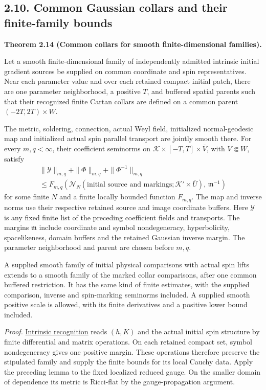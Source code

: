 \documentclass[
  english,
  11pt,
  reqno]{amsart}
\makeatletter
\newcommand{\paperdisplaynext}{%
  \let\paper@savedstartsection\@startsection
  \def\@startsection##1##2##3##4##5##6{%
    \let\@startsection\paper@savedstartsection
    \@tempskipa ##5\relax
    \ifdim\@tempskipa<\z@
      \def\paper@afterskip{.35\baselineskip}%
    \else
      \def\paper@afterskip{##5}%
    \fi
    \@startsection{##1}{##2}{##3}{##4}{\paper@afterskip}{##6}}}
\newcommand{\paperdisplaysection}{\paperdisplaynext\subsection}
\newcommand{\pandocstatementheading}[1]{%
  \par\if@nobreak\else
    \addpenalty{\@beginparpenalty}%
    \addvspace{.5\baselineskip plus .2\baselineskip minus .2\baselineskip}%
  \fi
  {\normalfont\bfseries #1\par}%
  \nobreak\@afterindenttrue\@afterheading
}
\let\paper@displaysection\paperdisplaysection
\renewcommand{\paperdisplaysection}[1]{%
  \let\paper@savedhangfrom\@hangfrom
  \long\def\@hangfrom##1##2{%
    \paper@savedhangfrom{##1}{\paper@headingparagraph##2}}%
  \paper@displaysection{#1}%
  \let\@hangfrom\paper@savedhangfrom}
\makeatother
\begin{document}
\paperdisplaysection{2.10. Common Gaussian collars and their finite-family
bounds}\label{common-gaussian-collars-and-their-finite-family-bounds}\label{sec:online-common-collar-families}

\pandocstatementheading{\leavevmode{}\label{thm:online-common-collar-finite-families}Theorem 2.14 (Common collars for smooth finite-dimensional families).}

Let a smooth finite-dimensional family of independently admitted
intrinsic initial gradient sources be supplied on common coordinate and
spin representatives. Near each parameter value and over each retained
compact initial patch, there are one parameter neighborhood, a positive
\(T\), and buffered spatial parents such that their recognized finite
Cartan collars are defined on a common parent \((-2T,2T)\times W\).

The metric, soldering, connection, actual Weyl field, initialized
normal-geodesic map and initialized actual spin parallel transport are
jointly smooth there. For every \(m,q<\infty\), their coefficient
seminorms on \(\mathcal K\times[-T,T]\times\overline V\), with
\(V\Subset W\), satisfy%
 \[
\begin{multlined}
\|\mathcal Y\|_{m,q}
+\|\Phi\|_{m,q}
+\|\Phi^{-1}\|_{m,q}
\\
\le
F_{m,q}\left(
\mathcal N_N(\text{initial source and markings};
\mathcal K'\times\overline U),\,
\mathfrak m^{-1}
\right)
\end{multlined}
\] for some finite \(N\) and a finite locally bounded function
\(F_{m,q}\). The map and inverse norms use their respective retained
source and image coordinate buffers. Here \(\mathcal Y\) is any fixed
finite list of the preceding coefficient fields and transports. The
margins \(\mathfrak m\) include coordinate and symbol nondegeneracy,
hyperbolicity, spacelikeness, domain buffers and the retained Gaussian
inverse margin. The parameter neighborhood and parent are chosen before
\(m,q\).

A supplied smooth family of initial physical comparisons with actual
spin lifts extends to a smooth family of the marked collar comparisons,
after one common buffered restriction. It has the same kind of finite
estimates, with the supplied comparison, inverse and spin-marking
seminorms included. A supplied smooth positive scale is allowed, with
its finite derivatives and a positive lower bound included.

\emph{Proof.}
\hyperref[thm:online-intrinsic-gradient-vacuum-recognition]{Intrinsic
recognition} reads \((h,K)\) and the actual initial spin structure by
finite differential and matrix operations. On each retained compact set,
symbol nondegeneracy gives one positive margin. These operations
therefore preserve the stipulated family and supply the finite bounds
for its local Cauchy data. Apply the preceding lemma to the fixed
localized reduced gauge. On the smaller domain of dependence its metric
is Ricci-flat by the gauge-propagation argument.
\end{document}
